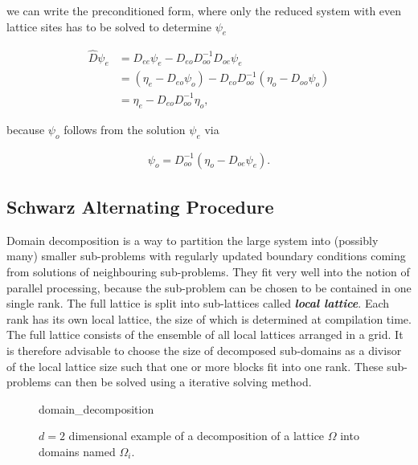 \documentclass{article}
\theoremstyle{plain} %
\theoremstyle{convention} %
\theoremstyle{remark} %
\def\df#1{\textbf{\textit{#1}}}
\numberwithin{equation}{section}
\begin{document}
we can write the preconditioned form, where only the reduced system with even lattice sites has to be solved to determine $\psi_e$

\begin{align*}
    \hat{D} \psi_e &= D_{ee} \psi_e - D_{eo} D_{oo}^{-1} D_{oe} \psi_e \\
    &= ( \eta_e - D_{eo} \psi_o ) - D_{eo} D_{oo}^{-1} ( \eta_o - D_{oo} \psi_o ) \\
    &= \eta_e - D_{eo} D_{oo}^{-1} \eta_o,
\end{align*}

because $\psi_o$ follows from the solution $\psi_e$ via

\begin{align*}
    \psi_o = D_{oo}^{-1} (\eta_o - D_{oe} \psi_e).
\end{align*}

\subsection{Schwarz Alternating Procedure}

\label{sec:ddecomp}

Domain decomposition is a way to partition the large system into (possibly many) smaller sub-problems with regularly updated boundary conditions coming from solutions of neighbouring sub-problems. They fit very well into the notion of parallel processing, because the sub-problem can be chosen to be contained in one single rank. The full lattice is split into sub-lattices called \df{local lattice}. Each rank has its own local lattice, the size of which is determined at compilation time. The full lattice consists of the ensemble of all local lattices arranged in a grid. It is therefore advisable to choose the size of decomposed sub-domains as a divisor of the local lattice size such that one or more blocks fit into one rank. These sub-problems can then be solved using a iterative solving method.

\begin{figure}[h]
  \centering
  {domain_decomposition}
  \caption{$d=2$ dimensional example of a decomposition of a lattice $\Omega$ into domains named $\Omega_i$.}
  \label{fig:ddecomp}
\end{figure}
\end{document}
